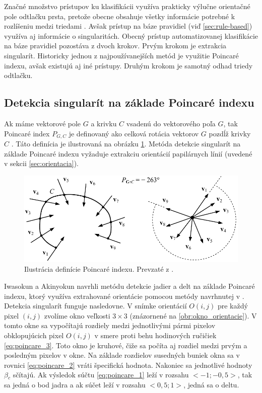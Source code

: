   Značné množstvo prístupov ku klasifikácii využíva prakticky výlučne orientačné pole odtlačku prsta, pretože obecne obsahuje všetky informácie potrebné
  k rozlíšeniu medzi triedami \cite{Handbook}. Avšak prístup na báze pravidiel (viď \ref{sec:rule-based}) využíva aj informácie o singularitách.
  Obecný prístup automatizovanej klasifikácie na báze pravidiel pozostáva z dvoch krokov. Prvým krokom je extrakcia singularít. Historicky jednou
  z najpoužívanejších metód je využitie Poincaré indexu, avšak existujú aj iné prístupy. Druhým krokom je samotný odhad triedy odtlačku.

  \subsection{Detekcia singularít na základe Poincaré indexu}
  Ak máme vektorové pole $G$ a krivku $C$ vsadenú do vektorového poľa $G$, tak Poincaré index $P_{G,C}$ je definovaný ako celková rotácia vektorov $G$ pozdĺž
  krivky $C$ \cite{Handbook}. Táto definícia je ilustrovaná na obrázku \ref{obr:poincare_index}. Metóda detekcie singularít na základe Poincaré indexu vyžaduje
  extrakciu orientácií papilárnych línií (uvedené v sekcii \ref{sec:orientacia}).

  \begin{figure}[h]
    \centering
    \includegraphics[width=0.5\linewidth]{obrazky-figures/poincare_index.png}
    \caption{Ilustrácia definície Poincaré indexu. Prevzaté z \cite{Handbook}.}
    \label{obr:poincare_index}
  \end{figure}

  Iwasokun a Akinyokun \cite{iwasokun2014singularities} navrhli metódu detekcie jadier a delt na základe Poincaré indexu, ktorý využíva extrahované orientácie
  pomocou metódy navrhnutej v \cite{Hong}. Detekcia singularít funguje nasledovne. V snímke orientácií $O(i,j)$ pre každý pixel $(i,j)$ zvolíme
  okno veľkosti $3\times{}3$ (znázornené na \ref{obr:okno_orientacie}). V tomto okne sa vypočítajú rozdiely medzi jednotlivými pármi pixelov
  obklopujúcich pixel $O(i,j)$ v smere proti behu hodinových ručičiek \ref{eq:poincare_3}. Toto okno je kruhové, čiže sa počíta aj rozdiel medzi prvým
  a posledným pixelov v okne. Na základe rozdielov susedných buniek okna sa v rovnici \ref{eq:poincare_2} vráti špecifická hodnota. Nakoniec sa jednotlivé
  hodnoty $\beta{}_c$ sčítajú. Ak výsledok súčtu \ref{eq:poincare_1} leží v rozsahu $<-1;-0,5>$, tak sa jedná o bod jadra a ak súčet leží v rozsahu $<0,5;1>$,
  jedná sa o deltu.

